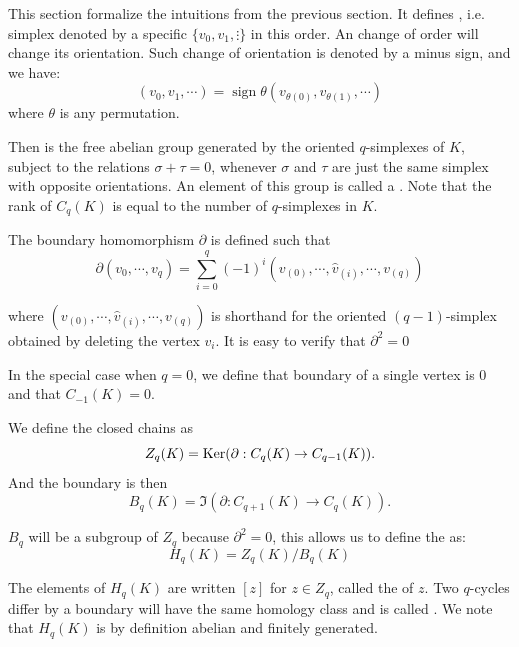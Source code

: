 This section formalize the intuitions from the previous section. It
defines , i.e. simplex denoted by a specific
$\{v_0,v_1,\vdots\}$ in this order. An change of order will change its
orientation. Such change of orientation is denoted by a minus sign,
and we have:
\begin{equation}
    (v_0,v_1,\cdots) = \operatorname{sign}\theta (v_{\theta(0)},
    v_{\theta(1)},\cdots)
\end{equation}
where $\theta$ is any permutation.

Then  is the free abelian group generated by the oriented
$q$-simplexes of $K$, subject to the relations $\sigma+\tau=0$,
whenever $\sigma$ and $\tau$ are just the same simplex with opposite
orientations. An element of this group is called a .
Note that the rank of $C_q(K)$ is equal to the number of
$q$-simplexes in $K$.

The boundary homomorphism $\partial$ is defined such that
\begin{equation}
    \partial(v_0,\cdots,v_q)=\sum_{i=0}^{q}(-1)^i
    (v_{(0)},\cdots,\hat{v}_{(i)},\cdots,v_{(q)})
\end{equation}

where $(v_{(0)},\cdots,\hat{v}_{(i)},\cdots,v_{(q)})$
is shorthand for the oriented $(q-1)$-simplex obtained by deleting
the vertex $v_i$. It is easy to verify that $\partial^2=0$

In the special case when $q=0$, we define that boundary of a single
vertex is $0$ and that $C_{-1}(K)=0$.

We define the closed chains  as
\begin{equation}
    Z_q(K)=\operatorname{Ker}(\partial:C_q(K)\to C_{q-1}(K)).
\end{equation}
And the boundary  is then
\begin{equation}
    B_q(K)=\Im(\partial:C_{q+1}(K)\to C_{q}(K)).
\end{equation}

$B_q$ will be a subgroup of $Z_q$ because $\partial^2=0$, this allows
us to define the  as:
\begin{equation}
    H_q(K)=Z_q(K)/B_q(K)
\end{equation}

The elements of $H_q(K)$ are written $[z]$ for $z\in Z_q$, called the
 of $z$. Two $q$-cycles differ by a boundary
will have the same homology class and is called . We note that $H_q(K)$ is by definition abelian and finitely
generated.

